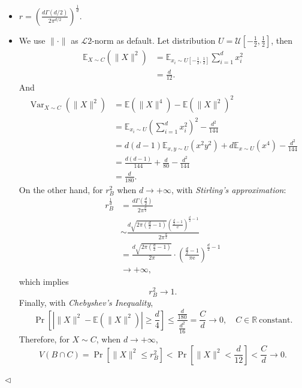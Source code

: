 ﻿\documentclass[11pt]{article}
\newenvironment{answer}[1][Answer]{\begin{trivlist}
\item[\hskip \labelsep {\bfseries #1.}\hskip \labelsep]}{\hfill$\lhd$\end{trivlist}}
\newcommand\E{\mathbb{E}}
\begin{document}
\begin{answer} ~
\begin{itemize}
    \item [(1)] $r=\left(\frac{d\Gamma(d/2)}{2\pi^{d/2}}\right)^{\frac{1}{d}}$.
    \item [(2)] We use $\|\cdot\|$ as $\mathcal L2$-norm as default. Let distribution $U=\mathcal U[-\frac{1}{2},\frac{1}{2}]$, then
    $$
        \begin{aligned}
            \E_{X\sim C}(\|X\|^2) &= \E_{x_i\sim U[-\frac{1}{2},\frac{1}{2}]} \sum_{i=1}^d x_i^2\\
            &= \frac{d}{12}.
        \end{aligned}
    $$
    And
    $$
        \begin{aligned}
            \operatorname{Var}_{X\sim C}(\|X\|^2) &= \E(\|X\|^4)-\E(\|X\|^2)^2\\
            &= \E_{x_i\sim U}\left(\sum_{i=1}^{d} x_i^2\right)^2-\frac{d^2}{144}\\
            &= d(d-1)\E_{x,y\sim U} (x^2y^2)+d\E_{x\sim U}(x^4)-\frac{d^2}{144}\\
            &= \frac{d(d-1)}{144}+\frac{d}{80}-\frac{d^2}{144}\\
            &= \frac{d}{180}.
        \end{aligned}
    $$
    On the other hand, for $r_B^2$ when $d\to+\infty$, with \textit{Stirling's approximation}:
    $$
        \begin{aligned}
            r_B^{\frac{1}{d}} &= \frac{d\Gamma\left(\frac{d}{2}\right)}{2\pi^{\frac{d}{2}}}\\
            &\sim \frac{d\sqrt{2\pi\left(\frac{d}{2}-1\right)}\left(\frac{\frac{d}{2}-1}{\mathrm{e}}\right)^{\frac{d}{2}-1}}{2\pi^{\frac{d}{2}}}\\
            &= \frac{d\sqrt{2\pi\left(\frac{d}{2}-1\right)}}{2\pi}\cdot\left(\frac{\frac{d}{2}-1}{\pi\mathrm{e}}\right)^{\frac{d}{2}-1}\\
            &\to +\infty,
        \end{aligned}
    $$
    which implies
    $$
        r_B^2\to 1.
    $$
    Finally, with \textit{Chebyshev's Inequality},
    $$
        \Pr\left[ |\|X\|^2-\E(\|X\|^2)|\ge \frac{d}{4} \right] \le \frac{\frac{d}{180}}{\frac{d^2}{16}} = \frac{C}{d} \to 0,\quad C\in\mathbb R~\text{constant}.
    $$
    Therefore, for $X\sim C$, when $d\to+\infty$,
    $$
        V(B\cap C)=\Pr\left[\|X\|^2\le r_B^2\right]<\Pr\left[\|X\|^2<\frac{d}{12}\right]<\frac{C}{d}\to 0.
    $$
\end{itemize}
\end{answer}
\end{document}
